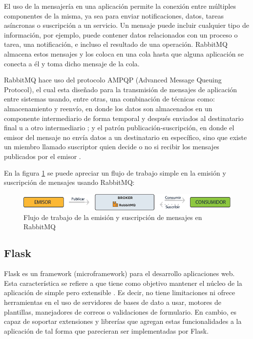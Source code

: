 El uso de la mensajería en una aplicación permite la conexión entre múltiples componentes de la misma, ya sea para enviar notificaciones, datos, tareas asíncronas o suscripción a un servicio.
Un mensaje puede incluir cualquier tipo de información, por ejemplo, puede contener datos relacionados con un proceso o tarea, una notificación, e incluso el resultado de una operación.
RabbitMQ almacena estos mensajes y los coloca en una cola hasta que alguna aplicación se conecta a él y toma dicho mensaje de la cola.

RabbitMQ hace uso del protocolo AMPQP (Advanced Message Queuing Protocol), el cual esta diseñado para la transmisión
de mensajes de aplicación entre sistemas usando, entre otras, una combinación de técnicas como: almacenamiento y reenvío, en donde
los datos son almacenados en un componente intermediario de forma temporal y después enviados al destinatario final u a otro
intermediario \cite{15}; y el patrón publicación-suscripción, en donde el emisor del mensaje no envía datos a un destinatario
en específico, sino que existe un miembro llamado suscriptor quien decide o no si recibir los mensajes publicados por el emisor \cite{16}.

En la figura \ref{fig:workflow_rabbitmq} se puede apreciar un flujo de trabajo simple en la emisión y suscripción de mensajes usando RabbitMQ:

\begin{figure}[H]
	\centering
		\includegraphics[width=1\textwidth]{figures/workflow_rabbitmq}
	\caption{Flujo de trabajo de la emisión y suscripción de mensajes en RabbitMQ}
	\label{fig:workflow_rabbitmq}
\end{figure}

\subsection{Flask}

Flask es un framework (microframework) para el desarrollo aplicaciones
web. Esta característica se refiere a que tiene como objetivo mantener
el núcleo de la aplicación de simple pero extensible \cite{19}.
Es decir, no tiene limitaciones ni ofrece herramientas en el uso de servidores de
bases de dato a usar, motores de plantillas, manejadores de correos o validaciones de
formulario.
En cambio, es capaz de soportar extensiones y librerías que agregan
estas funcionalidades a la aplicación de tal forma que parecieran ser implementadas por Flask.

